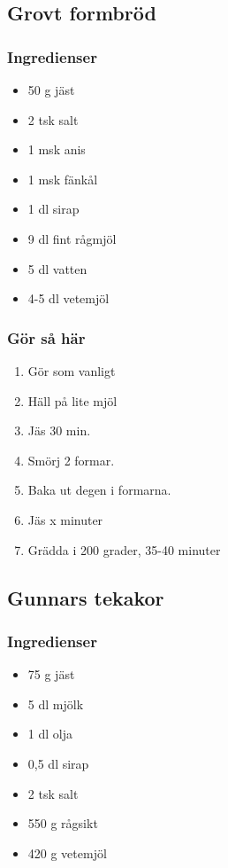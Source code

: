 \documentclass[a4paper,11pt,twocolumn]{article}
\begin{document}
\subsection{Grovt formbröd}
\subsubsection*{Ingredienser}
\begin{itemize}[noitemsep]
    \item 50 g jäst
    \item 2 tsk salt
    \item 1 msk anis
    \item 1 msk fänkål
    \item 1 dl sirap
    \item 9 dl fint rågmjöl
    \item 5 dl vatten
    \item 4-5 dl vetemjöl
\end{itemize}
\subsubsection*{Gör så här}
\begin{enumerate}[label=\arabic*.]
    \item Gör som vanligt
    \item Häll på lite mjöl
    \item Jäs 30 min.
    \item Smörj 2 formar.
    \item Baka ut degen i formarna.
    \item Jäs x minuter
    \item Grädda i 200 grader, 35-40 minuter
\end{enumerate}





\subsection{Gunnars tekakor}
\subsubsection*{Ingredienser}
\begin{itemize}[noitemsep]
    \item 75 g jäst
    \item 5 dl mjölk
    \item 1 dl olja
    \item 0,5 dl sirap
    \item 2 tsk salt
    \item 550 g rågsikt
    \item 420 g vetemjöl
\end{itemize}
\end{document}
